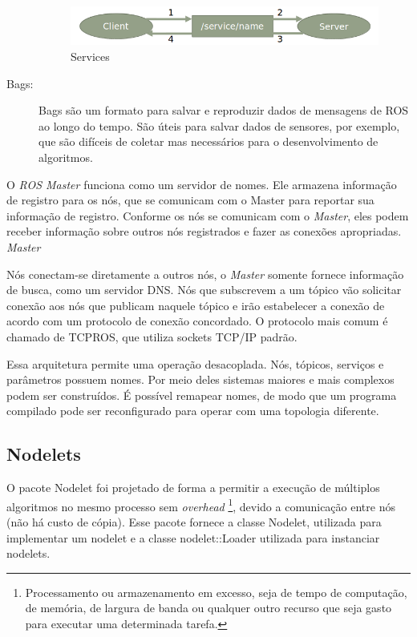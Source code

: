 \begin{description}
\begin{figure}[!h]
  \centering
  \includegraphics[width=0.7\linewidth]{./img/services.png}
  \caption{Services}
  \label{fig:services}
\end{figure}

\item[Bags:] Bags são um formato para salvar e reproduzir dados de mensagens de ROS ao longo do tempo. São úteis para salvar dados de sensores, por exemplo, que são difíceis de coletar mas necessários para o desenvolvimento de algoritmos. 
\end{description}

O \textit{ROS Master} funciona como um servidor de nomes. Ele armazena informação de registro para os nós, que se comunicam com o Master para reportar sua informação de registro. Conforme os nós se comunicam com o \textit{Master}, eles podem receber informação sobre outros nós registrados e fazer as conexões apropriadas. \textit{Master} 

Nós conectam-se diretamente a outros nós, o \textit{Master} somente fornece informação de busca, como um servidor DNS. Nós que subscrevem a um tópico vão solicitar conexão aos nós que publicam naquele tópico e irão estabelecer a conexão de acordo com um protocolo de conexão concordado. O protocolo mais comum é chamado de TCPROS, que utiliza sockets TCP/IP padrão.

Essa arquitetura permite uma operação desacoplada. Nós, tópicos, serviços e parâmetros possuem nomes. Por meio deles sistemas maiores e mais complexos podem ser construídos. É possível remapear nomes, de modo que um programa compilado  pode ser reconfigurado para operar com uma topologia diferente. 


\subsection{Nodelets}
O pacote Nodelet foi projetado de forma a permitir a execução de múltiplos algoritmos no mesmo processo sem \textit{overhead} \footnote{Processamento ou armazenamento em excesso, seja de tempo de computação, de memória, de largura de banda ou qualquer outro recurso que seja gasto para executar uma determinada tarefa.}, devido a comunicação entre nós (não há custo de cópia). Esse pacote fornece a classe Nodelet, utilizada para implementar um nodelet e a classe nodelet::Loader utilizada para instanciar nodelets. 

